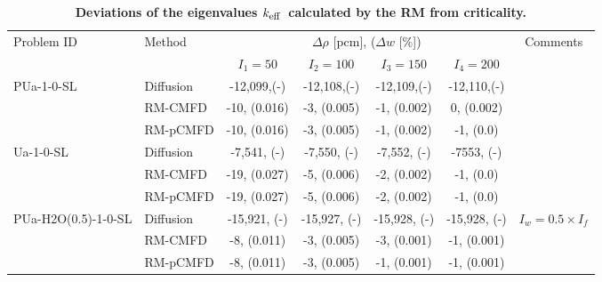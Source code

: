 \documentclass[letterpaper]{mc2021}
\newcommand{\keff}{\ensuremath{k_{\textrm{\scriptsize{eff}}}}}
\begin{document}
\begin{table}[hbt]
	\vspace{-7.5mm}	
	\centering
	\small
	\caption{\bf Deviations of the eigenvalues \keff \ calculated by the RM from criticality.}
	\label{table:res1} 
  \begin{tabular}{|l|l|c|c|c|c|c|} \hline 
	\multirow{2}{*}{Problem ID} & \multirow{2}{*}{Method} & \multicolumn{4}{c|}{$\Delta\rho$ [pcm], ($\Delta w$ [\%])} & \multirow{2}{*}{Comments} \\ 
	\cline{3-6}
	&  	 & $I_1 = 50$   & $I_2 = 100$ & $I_3 = 150$ & $I_4 = 200$    & \\ 
	\hline
	\multirow{3}{*}{PUa-1-0-SL} 		 & Diffusion  & -12,099,(-)  & -12,108,(-) & -12,109,(-) &-12,110,(-)   & \multirow{2}{*}{}\\ 
	\cline{2-6}
	& RM-CMFD  & -10, (0.016) & -3, (0.005) & -1, (0.002) & 0, (0.002)      & \multirow{2}{*}{}\\ 
	\cline{2-6}
	& RM-pCMFD & -10, (0.016) & -3, (0.005) & -1, (0.002) & -1, (0.0) & \\ 
	\hline
	\multirow{3}{*}{Ua-1-0-SL} 		     & Diffusion  & -7,541, (-)  & -7,550, (-) & -7,552, (-)  & -7553, (-)  & \multirow{2}{*}{}\\ 
	\cline{2-6}
	& RM-CMFD  & -19, (0.027)  & -5, (0.006) & -2, (0.002)  & -1, (0.0)  & \multirow{2}{*}{}\\ 
	\cline{2-6}
	& RM-pCMFD & -19, (0.027)  & -5, (0.006) & -2, (0.002)  & -1, (0.0)	  & \\ 
	\hline
	\multirow{2}{*}{PUa-H2O(0.5)-1-0-SL} & Diffusion  & -15,921, (-) & -15,927, (-) & -15,928, (-) & -15,928, (-) & \multirow{2}{*}{$I_w = 0.5\times I_f$} \\ 
	\cline{2-6}
	& RM-CMFD  & -8, (0.011)  & -3, (0.005) & -3, (0.001)	& -1, (0.001) &  \\ 
	\cline{2-6}
	& RM-pCMFD &-8, (0.011)	& -3, (0.005) & -1, (0.001)	& -1, (0.001) & \\ 
	\hline
\end{tabular}
\end{table}
%
\end{document}
